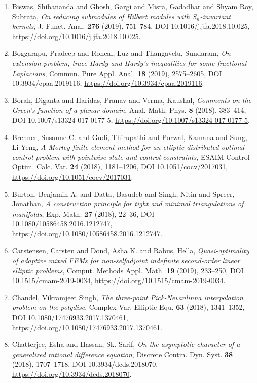 \begin{enumerate}
\item Biswas, Shibananda and Ghosh, Gargi and Misra, Gadadhar and
Shyam Roy, Subrata, {\em On reducing submodules of {H}ilbert modules with
{${S}_n$}-invariant kernels}, J. Funct. Anal. {\bf 276} (2019), 751--784, DOI 10.1016/j.jfa.2018.10.025, \url{https://doi.org/10.1016/j.jfa.2018.10.025}.
\item Boggarapu, Pradeep and Roncal, Luz and Thangavelu, Sundaram, {\em On extension problem, trace {H}ardy and {H}ardy's inequalities
for some fractional {L}aplacians}, Commun. Pure Appl. Anal. {\bf 18} (2019), 2575--2605, DOI 10.3934/cpaa.2019116, \url{https://doi.org/10.3934/cpaa.2019116}.
\item Borah, Diganta and Haridas, Pranav and Verma, Kaushal, {\em Comments on the {G}reen's function of a planar domain}, Anal. Math. Phys. {\bf 8} (2018), 383--414, DOI 10.1007/s13324-017-0177-5, \url{https://doi.org/10.1007/s13324-017-0177-5}.
\item Brenner, Susanne C. and Gudi, Thirupathi and Porwal, Kamana
and Sung, Li-Yeng, {\em A {M}orley finite element method for an elliptic distributed
optimal control problem with pointwise state and control
constraints}, ESAIM Control Optim. Calc. Var. {\bf 24} (2018), 1181--1206, DOI 10.1051/cocv/2017031, \url{https://doi.org/10.1051/cocv/2017031}.
\item Burton, Benjamin A. and Datta, Basudeb and Singh, Nitin and
Spreer, Jonathan, {\em A construction principle for tight and minimal triangulations
of manifolds}, Exp. Math. {\bf 27} (2018), 22--36, DOI 10.1080/10586458.2016.1212747, \url{https://doi.org/10.1080/10586458.2016.1212747}.
\item Carstensen, Carsten and Dond, Asha K. and Rabus, Hella, {\em Quasi-optimality of adaptive mixed {FEM}s for non-selfadjoint
indefinite second-order linear elliptic problems}, Comput. Methods Appl. Math. {\bf 19} (2019), 233--250, DOI 10.1515/cmam-2019-0034, \url{https://doi.org/10.1515/cmam-2019-0034}.
\item Chandel, Vikramjeet Singh, {\em The three-point {P}ick-{N}evanlinna interpolation problem on
the polydisc}, Complex Var. Elliptic Equ. {\bf 63} (2018), 1341--1352, DOI 10.1080/17476933.2017.1370461, \url{https://doi.org/10.1080/17476933.2017.1370461}.
\item Chatterjee, Esha and Hassan, Sk. Sarif, {\em On the asymptotic character of a generalized rational
difference equation}, Discrete Contin. Dyn. Syst. {\bf 38} (2018), 1707--1718, DOI 10.3934/dcds.2018070, \url{https://doi.org/10.3934/dcds.2018070}.

\end{enumerate}
